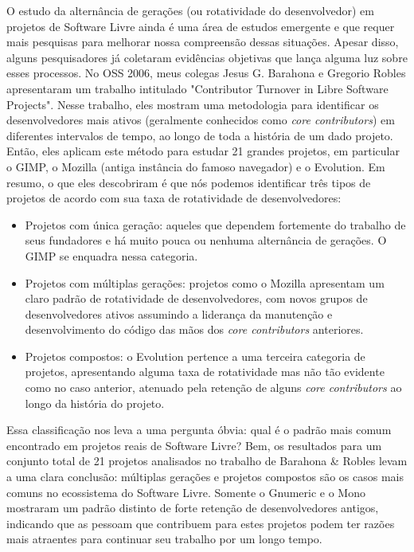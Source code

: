 O estudo da alternância de gerações (ou rotatividade do desenvolvedor) em projetos de Software Livre
ainda é uma área de estudos emergente e que requer mais pesquisas para melhorar nossa
compreensão dessas situações. Apesar disso, alguns pesquisadores já coletaram evidências
objetivas que lança alguma luz sobre esses processos.
No OSS 2006, meus colegas Jesus G. Barahona e Gregorio Robles apresentaram um trabalho
intitulado "Contributor Turnover in Libre Software Projects". Nesse trabalho,
eles mostram uma metodologia para identificar os desenvolvedores mais ativos (geralmente conhecidos
como \textit {core contributors}) em diferentes intervalos de tempo, ao longo de toda a história
de um dado projeto. Então, eles aplicam este método para estudar 21 grandes projetos, em
particular o GIMP, o Mozilla (antiga instância do famoso navegador) e
o Evolution. Em resumo, o que eles descobriram é que nós podemos identificar três tipos de
projetos de acordo com sua taxa de rotatividade de desenvolvedores:
\begin{itemize}
 \item Projetos com única geração: aqueles que dependem fortemente do trabalho de seus 
fundadores e há muito pouca ou nenhuma alternância de gerações. O GIMP se
enquadra nessa categoria.
 \item Projetos com múltiplas gerações: projetos como o Mozilla apresentam um claro
padrão de rotatividade de desenvolvedores, com novos grupos de desenvolvedores
ativos assumindo a liderança da manutenção e desenvolvimento do código das mãos
dos \textit {core contributors} anteriores.
 \item Projetos compostos: o Evolution pertence a uma terceira categoria de projetos,
apresentando alguma taxa de rotatividade mas não tão evidente como no caso anterior,
atenuado pela retenção de alguns \textit {core contributors} ao longo da história do
projeto.
\end{itemize}

Essa classificação nos leva a uma pergunta óbvia: qual é o padrão mais
comum encontrado em projetos reais de Software Livre? Bem, os resultados
para um conjunto total de 21 projetos analisados no trabalho de Barahona \& Robles levam a uma clara conclusão:
múltiplas gerações e projetos compostos são os casos mais comuns no ecossistema
do Software Livre. Somente o Gnumeric e o Mono mostraram um padrão distinto de forte retenção
de desenvolvedores antigos, indicando que as pessoam que contribuem para estes projetos podem 
ter razões mais atraentes para continuar seu trabalho por um longo tempo.

